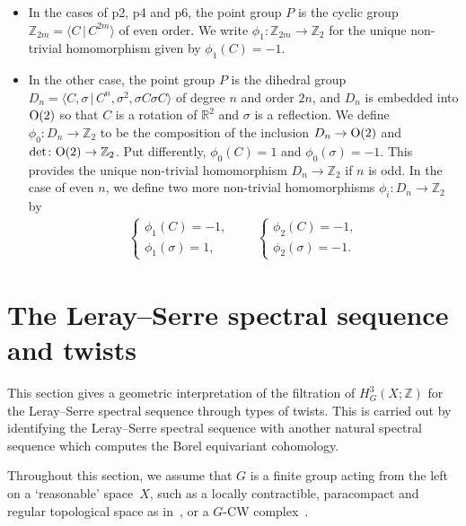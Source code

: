 \documentclass[11pt]{article}
\theoremstyle{definition}
\newcommand{\R}{\mathbb{R}}
\newcommand{\Z}{\mathbb{Z}}
\begin{document}
\begin{itemize}\itemsep=0pt
\item
In the cases of \textsf{p2}, \textsf{p4} and \textsf{p6}, the point group $P$ is the cyclic group $\Z_{2m} = \langle C \,|\, C^{2m} \rangle$ of even order. We write $\phi_1\colon \Z_{2m} \to \Z_2$ for the unique non-trivial homomorphism given by $\phi_1(C) = -1$.

\item
In the other case, the point group $P$ is the dihedral group $D_n = \langle C, \sigma \,|\, C^n, \sigma^2, \sigma C \sigma C \rangle$
of degree $n$ and order $2n$, and $D_n$ is embedded into ${\rm O}(2)$ so that $C$ is a rotation of $\R^2$ and $\sigma$ is a ref\/lection. We def\/ine $\phi_0 \colon D_n \to \Z_2$ to be the composition of the inclusion $D_n \to {\rm O}(2)$ and $\det \colon {\rm O}(2) \to \Z_2$. Put dif\/ferently, $\phi_0(C) = 1$ and $\phi_0(\sigma) = -1$. This provides the unique non-trivial homomorphism $D_n \to \Z_2$ if $n$ is odd. In the case of even $n$, we def\/ine two more non-trivial homomorphisms $\phi_i \colon D_n \to \Z_2$ by
\begin{gather*}
\begin{cases}
\phi_1(C) = -1, \\
\phi_1(\sigma) = 1,
\end{cases} \qquad
\begin{cases}
\phi_2(C) = -1, \\
\phi_2(\sigma) = -1.
\end{cases}
\end{gather*}
\end{itemize}

\setcounter{section}{2}
\setcounter{subsection}{4}
\setcounter{subsubsection}{0}
\setcounter{thm}{4}
\setcounter{equation}{0}
\section{The Leray--Serre spectral sequence and twists}\label{sec:spectral_seq_and_twist}

This section gives a geometric interpretation of the f\/iltration of $H^3_G(X; \Z)$ for the Leray--Serre spectral sequence through types of twists. This is carried out by identifying the Leray--Serre spectral sequence with another natural spectral sequence which computes the Borel equivariant cohomology.

Throughout this section, we assume that $G$ is a f\/inite group acting from the left on a `reasonable' space~$X$, such as a locally contractible, paracompact and regular topological space as in~\cite{FHT}, or a $G$-CW complex~\cite{May}.
\end{document}

